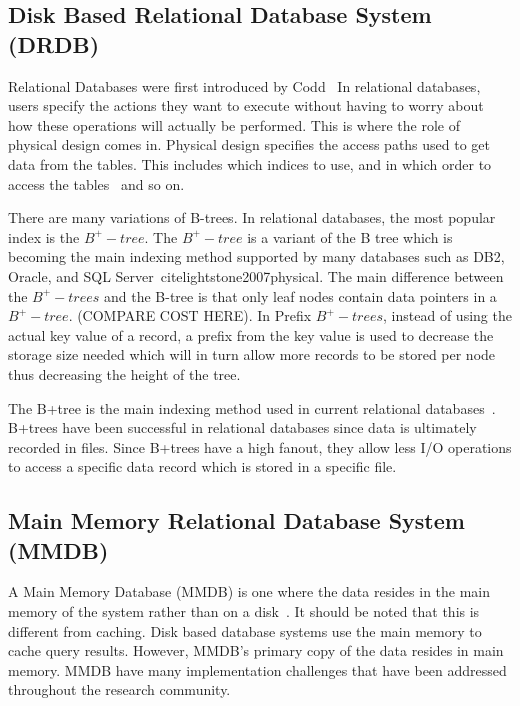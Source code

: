 \documentclass[12pt,a4paper]{article}
\begin{document}
\subsection{Disk Based Relational Database System (DRDB)}
\label{SEC-DDRDB}

Relational Databases were first introduced by Codd~\cite{codd1970relational}
In relational databases, users specify the actions they want to execute without having to worry about how these operations will actually be performed. This is where the role of physical design comes in. Physical design specifies the access paths used to get data from the tables. This includes which indices to use, and in which order to access the tables~\cite{finkelstein1988physical} and so on.


There are many variations of B-trees. In relational databases, the most popular index is the $B^{+}-tree$. The $B^{+}-tree$ is a variant of the B  tree which is becoming the main indexing method supported by many databases such as DB2, Oracle, and SQL Server~cite{lightstone2007physical}. The main difference between the $B^{+}-trees$ and the B-tree is that only leaf nodes contain data pointers in a $B^{+}-tree$. (COMPARE COST HERE). In Prefix $B^{+}-trees$, instead of using the actual key value of a record, a prefix from the key value is used to decrease the storage size needed which will in turn allow more records to be stored per node thus decreasing the height of the tree.

The B+tree is the main indexing method used in current relational databases~\cite{lightstone2007physical}. B+trees have been successful in relational databases since data is ultimately recorded in files. Since B+trees have a high fanout, they allow less I/O operations to access a specific data record which is stored in a specific file.


\subsection{Main Memory Relational Database System (MMDB)}
\label{SEC-MMDB}

A Main Memory Database (MMDB) is one where the data resides in the main memory of the system rather than on a disk~\cite{garcia1992main}. It should be noted that this is different from caching. Disk based database systems use the main memory to cache query results. However, MMDB's primary copy of the data resides in main memory. MMDB have many implementation challenges that have been addressed throughout the research community.
\end{document}
